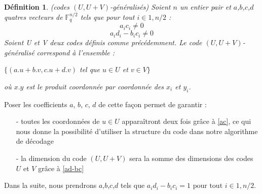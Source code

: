\documentclass[12pt]{article}
\theoremstyle{plain}
\newtheorem{defi}[thm]{Définition}
\newcommand{\F}{\mathbb{F}}
\begin{document}
\begin{defi} \label{UV-normalise} (codes $(U,U+V)$-généralisés) Soient $n$ un entier pair et $a$,$b$,$c$,$d$ quatres vecteurs de $\F_q^{n/2}$ tels que pour tout $i \in {1,n/2}$ :
$$ a_ic_i \neq 0 $$
$$ a_id_i - b_ic_i \neq 0 $$
Soient U et V deux codes définis comme précédemment. Le code $(U,U+V)$-généralisé correspond à l'ensemble :
\begin{center}
$\{(a.u + b.v, c.u + d.v)$ tel que $u \in U$ et $v \in V \}$
\end{center}
où $x.y$ est le produit coordonnée par coordonnée des $x_i$ et $y_i$.\\
\end{defi}


Poser les coefficients $a$, $b$, $c$, $d$ de cette façon permet de garantir :
\begin{itemize}
\item[-] toutes les coordonnées de $u \in U$ apparaîtront deux fois grâce  à \eqref{ac}, ce qui nous donne la possibilité d'utiliser la structure du code dans notre algorithme de décodage
\item[-] la dimension du code $(U,U+V)$ sera la somme des dimensions des codes $U$ et $V$ grâce à \eqref{ad-bc}
\end{itemize}

Dans la suite, nous prendrons $a$,$b$,$c$,$d$ tels que $a_id_i - b_ic_i = 1 \text{ pour tout } i \in {1,n/2}.$ \\
\end{document}
